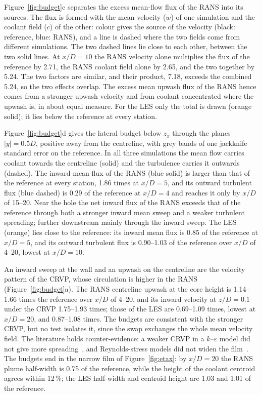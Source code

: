 \documentclass[colorlinks,upint,subscriptcorrection,varvw,hyphenate,balance,lineno]{asmeconf}
\begin{document}
Figure~\ref{fig:budget}c separates the excess mean-flow flux of the RANS into its sources. The flux is formed with
the mean velocity ($w$) of one simulation and the coolant field ($c$) of the other: colour gives the source of the
velocity (black: reference, blue: RANS), and a line is dashed where the two fields come from different
simulations. The two dashed lines lie close to each other, between the two solid lines. At $x/D=10$ the RANS
velocity alone multiplies the flux of the reference by 2.71, the RANS coolant field alone by 2.65, and the two
together by 5.24. The two factors are similar, and their product, 7.18, exceeds the combined 5.24, so the two effects
overlap. The excess mean upwash flux of the RANS hence comes from a stronger upwash velocity and from coolant
concentrated where the upwash is, in about equal measure. For the LES only the total is drawn (orange solid); it
lies below the reference at every station.

Figure~\ref{fig:budget}d gives the lateral budget below $z_x$ through the planes $|y|=0.5D$, positive away from the centreline, with grey bands
of one jackknife standard error on the reference. In all three simulations the mean flow carries coolant
towards the centreline (solid) and the turbulence carries it outwards (dashed). The inward mean flux of the RANS
(blue solid) is larger than that of the reference at every station, 1.86 times at $x/D=5$, and its outward
turbulent flux (blue dashed) is 0.29 of the reference at $x/D=4$ and reaches it only by $x/D$ of 15--20. Near the
hole the net inward flux of the RANS exceeds that of the reference through both a stronger inward mean sweep and a
weaker turbulent spreading; further downstream mainly through the inward sweep. The LES (orange) lies close to
the reference: its inward mean flux is 0.85 of the reference at $x/D=5$, and its outward turbulent flux is
0.90--1.03 of the reference over $x/D$ of 4--20, lowest at $x/D=10$.

An inward sweep at the wall and an upwash on the centreline are the velocity pattern of the CRVP, whose
circulation is higher in the RANS (Figure~\ref{fig:budget}a). The RANS centreline upwash at the core height
is 1.14--1.66 times the reference over $x/D$ of 4--20, and its inward velocity at $z/D=0.1$ under the CRVP
1.75--1.93 times; those of the LES are 0.69--1.09 times, lowest at $x/D=20$, and 0.87--1.08 times. The budgets are consistent with the stronger CRVP, but no test isolates it, since the swap
exchanges the whole mean velocity field. The literature holds counter-evidence: a weaker CRVP in a $k$--$\varepsilon$
model did not give more spreading~\cite{stratton2019}, and Reynolds-stress models did not widen the
film~\cite{acharya2001,harrison2008}. The budgets end in the narrow film of Figure~\ref{fig:etax}: by $x/D=20$ the
RANS plume half-width is 0.75 of the reference, while the height of the coolant centroid agrees within 12\,\%;
the LES half-width and centroid height are 1.03 and 1.01 of the reference.
\end{document}
